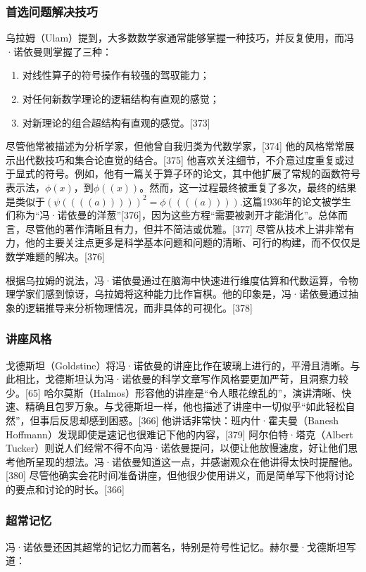 \subsubsection{首选问题解决技巧}  
乌拉姆（Ulam）提到，大多数数学家通常能够掌握一种技巧，并反复使用，而冯·诺依曼则掌握了三种：
\begin{enumerate}
\item 对线性算子的符号操作有较强的驾驭能力；
\item 对任何新数学理论的逻辑结构有直观的感觉；
\item 对新理论的组合超结构有直观的感觉。[373]
\end{enumerate}
尽管他常被描述为分析学家，但他曾自我归类为代数学家，[374] 他的风格常常展示出代数技巧和集合论直觉的结合。[375] 他喜欢关注细节，不介意过度重复或过于显式的符号。例如，他有一篇关于算子环的论文，其中他扩展了常规的函数符号表示法，\(\phi(x)\)，到\(\phi((x))\)。然而，这一过程最终被重复了多次，最终的结果是类似于\((\psi ((((a)))))^{2}=\phi ((((a)))).\)这篇1936年的论文被学生们称为“冯·诺依曼的洋葱”[376]，因为这些方程“需要被剥开才能消化”。总体而言，尽管他的著作清晰且有力，但并不简洁或优雅。[377] 尽管从技术上讲非常有力，他的主要关注点更多是科学基本问题和问题的清晰、可行的构建，而不仅仅是数学难题的解决。[376]

根据乌拉姆的说法，冯·诺依曼通过在脑海中快速进行维度估算和代数运算，令物理学家们感到惊讶，乌拉姆将这种能力比作盲棋。他的印象是，冯·诺依曼通过抽象的逻辑推导来分析物理情况，而非具体的可视化。[378]
\subsubsection{讲座风格}  
戈德斯坦（Goldstine）将冯·诺依曼的讲座比作在玻璃上进行的，平滑且清晰。与此相比，戈德斯坦认为冯·诺依曼的科学文章写作风格要更加严苛，且洞察力较少。[65] 哈尔莫斯（Halmos）形容他的讲座是“令人眼花缭乱的”，演讲清晰、快速、精确且包罗万象。与戈德斯坦一样，他也描述了讲座中一切似乎“如此轻松自然”，但事后反思却感到困惑。[366] 他讲话非常快：班内什·霍夫曼（Banesh Hoffmann）发现即使是速记也很难记下他的内容，[379] 阿尔伯特·塔克（Albert Tucker）则说人们经常不得不向冯·诺依曼提问，以便让他放慢速度，好让他们思考他所呈现的想法。冯·诺依曼知道这一点，并感谢观众在他讲得太快时提醒他。[380] 尽管他确实会花时间准备讲座，但他很少使用讲义，而是简单写下他将讨论的要点和讨论的时长。[366]
\subsubsection{超常记忆}  
冯·诺依曼还因其超常的记忆力而著名，特别是符号性记忆。赫尔曼·戈德斯坦写道：

